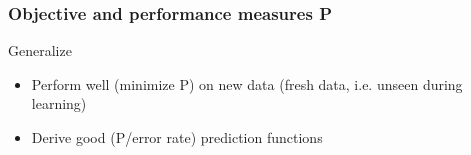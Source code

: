 \documentclass[pressentation,9pt,aspectratio=1610,xcolor=table]{beamer}
\newcommand{\doigt}{\noindent \Pisymbol{pzd}{43}}
\begin{document}
\begin{frame}
  \frametitle{Objective and performance measures P}
  
  \begin{block}{Generalize}
    \begin{itemize}
    \item Perform well (minimize P) on \alert{new data} (fresh data, i.e. unseen during learning)
    \item[\doigt]  Derive good (P/error rate) prediction functions
    \end{itemize}    
  \end{block}

  
\end{frame}
\end{document}

